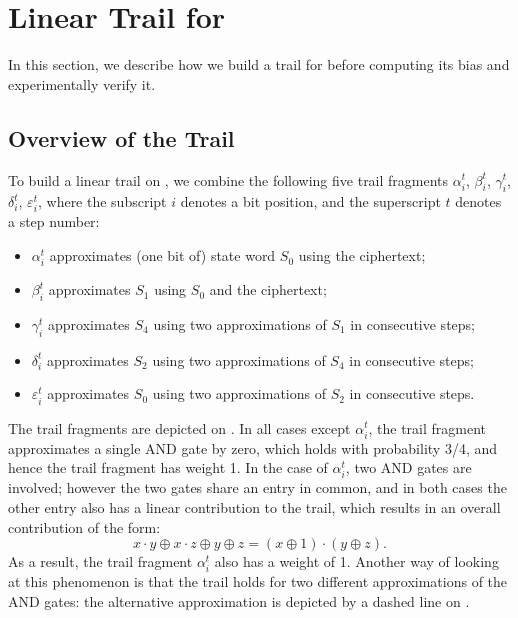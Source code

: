 
\section{Linear Trail for \MiniMORUS}
\label{sec/minitrails}

In this section, we describe how we build a trail for \MiniMORUS before computing its bias and experimentally verify it.

\subsection{Overview of the Trail}

To build a linear trail on \MiniMORUS, we combine the following five trail fragments $\alpha^t_i$, $\beta^t_i$, $\gamma^t_i$, $\delta^t_i$, $\varepsilon^t_i$, where the subscript $i$ denotes a bit position, and the superscript $t$ denotes a step number:
\begin{itemize}
    \item $\alpha^t_i$ approximates (one bit of) state word $S_0$ using the ciphertext;
    \item $\beta^t_i$ approximates $S_1$ using $S_0$ and the ciphertext;
    \item $\gamma^t_i$ approximates $S_4$ using two approximations of $S_1$ in consecutive steps;
    \item $\delta^t_i$ approximates $S_2$ using two approximations of $S_4$ in consecutive steps;
    \item $\varepsilon^t_i$ approximates $S_0$ using two approximations of $S_2$ in consecutive steps.
\end{itemize}

The trail fragments are depicted on . In all cases except $\alpha^t_i$, the trail fragment approximates a single AND gate by zero, which holds with probability 3/4, and hence the trail fragment has weight 1. In the case of $\alpha^t_i$, two AND gates are involved; however the two gates share an entry in common, and in both cases the other entry also has a linear contribution to the trail, which results in an overall contribution of the form:
\[
x \cdot y \oplus x \cdot z \oplus y \oplus z= (x \oplus 1) \cdot (y \oplus z).
\]
As a result, the trail fragment $\alpha^t_i$ also has a weight of 1. Another way of looking at this phenomenon is that the trail holds for two different approximations of the AND gates: the alternative approximation is depicted by a dashed line on .

